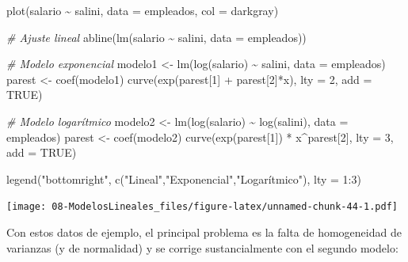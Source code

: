 \documentclass[
]{book}
\newenvironment{Shaded}{\begin{snugshade}}{\end{snugshade}}
\newcommand{\AttributeTok}[1]{\textcolor[rgb]{0.77,0.63,0.00}{#1}}
\newcommand{\CommentTok}[1]{\textcolor[rgb]{0.56,0.35,0.01}{\textit{#1}}}
\newcommand{\ConstantTok}[1]{\textcolor[rgb]{0.00,0.00,0.00}{#1}}
\newcommand{\DecValTok}[1]{\textcolor[rgb]{0.00,0.00,0.81}{#1}}
\newcommand{\FunctionTok}[1]{\textcolor[rgb]{0.00,0.00,0.00}{#1}}
\newcommand{\NormalTok}[1]{#1}
\newcommand{\OtherTok}[1]{\textcolor[rgb]{0.56,0.35,0.01}{#1}}
\newcommand{\SpecialCharTok}[1]{\textcolor[rgb]{0.00,0.00,0.00}{#1}}
\newcommand{\StringTok}[1]{\textcolor[rgb]{0.31,0.60,0.02}{#1}}
\theoremstyle{break}
\begin{document}
\begin{Shaded}
\begin{Highlighting}[]
\FunctionTok{plot}\NormalTok{(salario }\SpecialCharTok{\textasciitilde{}}\NormalTok{ salini, }\AttributeTok{data =}\NormalTok{ empleados, }\AttributeTok{col =} \StringTok{\textquotesingle{}darkgray\textquotesingle{}}\NormalTok{)}

\CommentTok{\# Ajuste lineal}
\FunctionTok{abline}\NormalTok{(}\FunctionTok{lm}\NormalTok{(salario }\SpecialCharTok{\textasciitilde{}}\NormalTok{ salini, }\AttributeTok{data =}\NormalTok{ empleados)) }

\CommentTok{\# Modelo exponencial}
\NormalTok{modelo1 }\OtherTok{\textless{}{-}} \FunctionTok{lm}\NormalTok{(}\FunctionTok{log}\NormalTok{(salario) }\SpecialCharTok{\textasciitilde{}}\NormalTok{ salini, }\AttributeTok{data =}\NormalTok{ empleados)}
\NormalTok{parest }\OtherTok{\textless{}{-}} \FunctionTok{coef}\NormalTok{(modelo1)}
\FunctionTok{curve}\NormalTok{(}\FunctionTok{exp}\NormalTok{(parest[}\DecValTok{1}\NormalTok{] }\SpecialCharTok{+}\NormalTok{ parest[}\DecValTok{2}\NormalTok{]}\SpecialCharTok{*}\NormalTok{x), }\AttributeTok{lty =} \DecValTok{2}\NormalTok{, }\AttributeTok{add =} \ConstantTok{TRUE}\NormalTok{)}

\CommentTok{\# Modelo logarítmico}
\NormalTok{modelo2 }\OtherTok{\textless{}{-}} \FunctionTok{lm}\NormalTok{(}\FunctionTok{log}\NormalTok{(salario) }\SpecialCharTok{\textasciitilde{}} \FunctionTok{log}\NormalTok{(salini), }\AttributeTok{data =}\NormalTok{ empleados)}
\NormalTok{parest }\OtherTok{\textless{}{-}} \FunctionTok{coef}\NormalTok{(modelo2)}
\FunctionTok{curve}\NormalTok{(}\FunctionTok{exp}\NormalTok{(parest[}\DecValTok{1}\NormalTok{]) }\SpecialCharTok{*}\NormalTok{ x}\SpecialCharTok{\^{}}\NormalTok{parest[}\DecValTok{2}\NormalTok{], }\AttributeTok{lty =} \DecValTok{3}\NormalTok{, }\AttributeTok{add =} \ConstantTok{TRUE}\NormalTok{)}

\FunctionTok{legend}\NormalTok{(}\StringTok{"bottomright"}\NormalTok{, }\FunctionTok{c}\NormalTok{(}\StringTok{"Lineal"}\NormalTok{,}\StringTok{"Exponencial"}\NormalTok{,}\StringTok{"Logarítmico"}\NormalTok{), }\AttributeTok{lty =} \DecValTok{1}\SpecialCharTok{:}\DecValTok{3}\NormalTok{)}
\end{Highlighting}
\end{Shaded}

\texttt{[image: 08-ModelosLineales\_files/figure-latex/unnamed-chunk-44-1.pdf]}

Con estos datos de ejemplo, el principal problema es la falta de homogeneidad de varianzas (y de normalidad) y se corrige sustancialmente con el segundo modelo:
\end{document}
